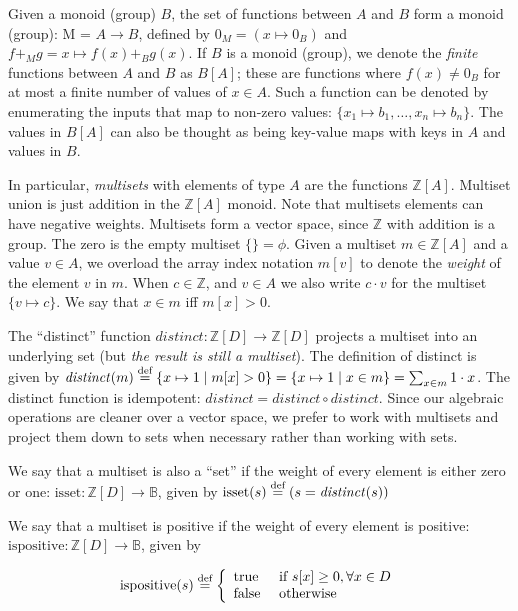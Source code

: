 \documentclass[10pt]{article}
\newcommand{\Z}{\mathbb{Z}}  %
\newcommand{\B}{\mathbb{B}}  %
\newcommand{\distinct}{\mathit{distinct}}  %
\newcommand{\isset}{\mbox{isset}}
\newcommand{\ispositive}{\mbox{ispositive}}
\newcommand{\defn}{\stackrel{\textrm{\scriptsize def}}{=}}
\begin{document}
Given a monoid (group) $B$, the set of functions between $A$ and $B$
form a monoid (group): M = $A \rightarrow B$, defined by $0_M = (x
\mapsto 0_B)$ and $f +_M g = x \mapsto f(x) +_B g(x)$.  If $B$ is a
monoid (group), we denote the \emph{finite} functions between $A$ and
$B$ as $B[A]$; these are functions where $f(x) \not= 0_B$ for at most
a finite number of values of $x \in A$.  Such a function can be
denoted by enumerating the inputs that map to non-zero values: $\{ x_1
\mapsto b_1, \dots, x_n \mapsto b_n \}$.  The values in $B[A]$ can
also be thought as being key-value maps with keys in $A$ and values in
$B$.

In particular, \emph{multisets} with elements of type $A$ are the
functions $\Z[A]$.  Multiset union is just addition in the $\Z[A]$
monoid.  Note that multisets elements can have negative weights.
Multisets form a vector space, since $\Z$ with addition is a group.
The zero is the empty multiset $\{\} = \phi$.  Given a multiset $m \in
\Z[A]$ and a value $v \in A$, we overload the array index notation
$m[v]$ to denote the \emph{weight} of the element $v$ in $m$.  When $c
\in \Z$, and $v \in A$ we also write $c \cdot v$ for the multiset $\{
v \mapsto c \}$.  We say that $x \in m$ iff $m[x] > 0$.

The ``distinct'' function $\distinct: \Z[D] \rightarrow \Z[D]$
projects a multiset into an underlying set (but \emph{the result is
  still a multiset}).  The definition of distinct is given by
$\distinct(m) \defn \{ x \mapsto 1 \;|\; m[x] > 0 \} = \{ x \mapsto 1
\;|\; x \in m \} = \sum_{x \in m} 1 \cdot x$.  The distinct
function is idempotent: $\distinct = \distinct \circ \distinct$.
Since our algebraic operations are cleaner over a vector space, we
prefer to work with multisets and project them down to sets when
necessary rather than working with sets.

We say that a multiset is also a ``set'' if the weight of every
element is either zero or one: $\isset : \Z[D] \rightarrow \B$,
given by $\isset(s) \defn (s = \distinct(s))$

We say that a multiset is positive if the weight of every element is
positive: $\ispositive : \Z[D] \rightarrow \B$, given by

$$\ispositive(s) \defn \left\{
\begin{array}{ll}
  \mbox{true} & \mbox{ if } s[x] \geq 0, \forall x \in D \\
  \mbox{false} & \mbox{ otherwise}
\end{array}
\right.$$
\end{document}
